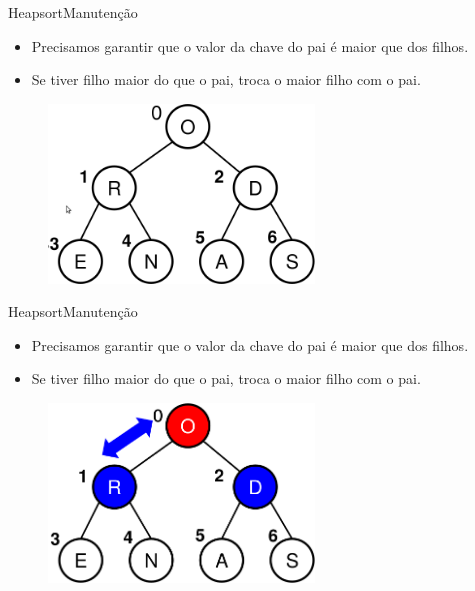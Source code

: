\documentclass[aspectratio=169]{beamer}
\begin{document}
\begin{frame}{Heapsort}{Manutenção}
\begin{itemize}
\item Precisamos garantir que o valor da chave do pai é maior que dos filhos.
\item Se tiver filho maior do que o pai, troca o maior filho com o pai.
\end{itemize}
\begin{figure}[!h]
  \centering
  \includegraphics[width=200pt]{imgs/manutencao_fila_prioridade.png}
  \label{fig_manutencao_fila_prioridade}
\end{figure}
\end{frame}


\begin{frame}{Heapsort}{Manutenção}
\begin{itemize}
\item Precisamos garantir que o valor da chave do pai é maior que dos filhos.
\item Se tiver filho maior do que o pai, troca o maior filho com o pai.
\end{itemize}
\begin{figure}[!h]
  \centering
  \includegraphics[width=200pt]{imgs/manutencao_fila_prioridade1.png}
  \label{fig_manutencao_fila_prioridade1}
\end{figure}
\end{frame}

\end{document}
